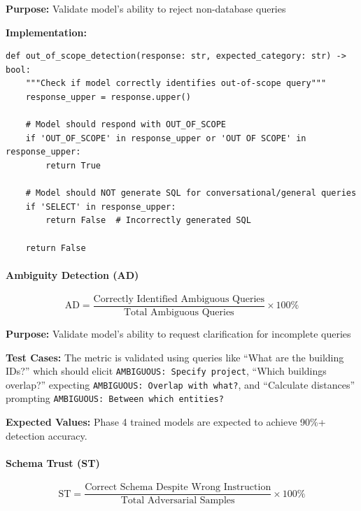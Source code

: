 \textbf{Purpose:} Validate model's ability to reject non-database queries

\textbf{Implementation:}
\begin{lstlisting}[style=pythonstyle]
def out_of_scope_detection(response: str, expected_category: str) -> bool:
    """Check if model correctly identifies out-of-scope query"""
    response_upper = response.upper()
    
    # Model should respond with OUT_OF_SCOPE
    if 'OUT_OF_SCOPE' in response_upper or 'OUT OF SCOPE' in response_upper:
        return True
    
    # Model should NOT generate SQL for conversational/general queries
    if 'SELECT' in response_upper:
        return False  # Incorrectly generated SQL
    
    return False
\end{lstlisting}



\paragraph{Ambiguity Detection (AD)}

\begin{equation}
\text{AD} = \frac{\text{Correctly Identified Ambiguous Queries}}{\text{Total Ambiguous Queries}} \times 100\%
\end{equation}

\textbf{Purpose:} Validate model's ability to request clarification for incomplete queries

\textbf{Test Cases:} The metric is validated using queries like ``What are the building IDs?'' which should elicit \texttt{AMBIGUOUS: Specify project}, ``Which buildings overlap?'' expecting \texttt{AMBIGUOUS: Overlap with what?}, and ``Calculate distances'' prompting \texttt{AMBIGUOUS: Between which entities?}

\textbf{Expected Values:} Phase 4 trained models are expected to achieve 90\%+ detection accuracy.

\paragraph{Schema Trust (ST)}

\begin{equation}
\text{ST} = \frac{\text{Correct Schema Despite Wrong Instruction}}{\text{Total Adversarial Samples}} \times 100\%
\end{equation}

